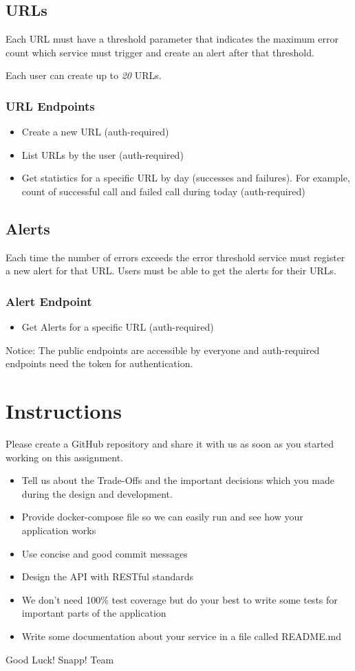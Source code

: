\documentclass{article}
\begin{document}
\subsection{URLs}
Each URL must have a threshold parameter that indicates the maximum error count which service must trigger and create an alert after that threshold.

Each user can create up to \textit{20} URLs.

\subsubsection{URL Endpoints}
\begin{itemize}
  \item Create a new URL (auth-required)
  \item List URLs by the user (auth-required)
  \item Get statistics for a specific URL by day (successes and failures). For example, count of successful call and failed call during today (auth-required)
\end{itemize}

\subsection{Alerts}
Each time the number of errors exceeds the error threshold service must register a new alert for that URL.
Users must be able to get the alerts for their URLs.

\subsubsection{Alert Endpoint}
\begin{itemize}
  \item Get Alerts for a specific URL (auth-required)
\end{itemize}


Notice: The public endpoints are accessible by everyone and auth-required endpoints need the token for authentication.

\section{Instructions}

Please create a GitHub repository and share it with us as soon as you started working on this assignment.

\begin{itemize}
  \item Tell us about the Trade-Offs and the important decisions which you made during the design and development.
  \item Provide docker-compose file so we can easily run and see how your application works
  \item Use concise and good commit messages
  \item Design the API with RESTful standards
  \item We don’t need 100\% test coverage but do your best to write some tests for important parts of the application
  \item Write some documentation about your service in a file called README.md
\end{itemize}

Good Luck!
Snapp! Team
\end{document}
